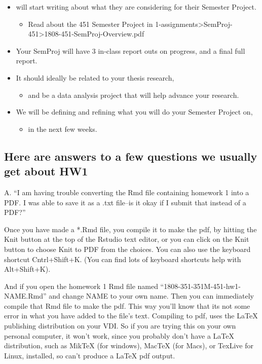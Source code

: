 \documentclass[]{article}
\providecommand{\tightlist}{%
  \setlength{\itemsep}{0pt}\setlength{\parskip}{0pt}}
\begin{document}
\begin{itemize}
\tightlist
\item
  will start writing about what they are considering for their Semester
  Project.

  \begin{itemize}
  \tightlist
  \item
    Read about the 451 Semester Project in
    1-assignments\textgreater{}SemProj-451\textgreater{}1808-451-SemProj-Overview.pdf
  \end{itemize}
\item
  Your SemProj will have 3 in-class report outs on progress, and a final
  full report.
\item
  It should ideally be related to your thesis research,

  \begin{itemize}
  \tightlist
  \item
    and be a data analysis project that will help advance your
    research.\\
  \end{itemize}
\item
  We will be defining and refining what you will do your Semester
  Project on,

  \begin{itemize}
  \tightlist
  \item
    in the next few weeks.
  \end{itemize}
\end{itemize}

\hypertarget{here-are-answers-to-a-few-questions-we-usually-get-about-hw1}{%
\subsection{Here are answers to a few questions we usually get about
HW1}\label{here-are-answers-to-a-few-questions-we-usually-get-about-hw1}}

A. ``I am having trouble converting the Rmd file containing homework 1
into a PDF. I was able to save it as a .txt file--is it okay if I submit
that instead of a PDF?''

Once you have made a *.Rmd file, you compile it to make the pdf, by
hitting the Knit button at the top of the Rstudio text editor, or you
can click on the Knit button to choose Knit to PDF from the choices. You
can also use the keyboard shortcut Cntrl+Shift+K. (You can find lots of
keyboard shortcuts help with Alt+Shift+K).

And if you open the homework 1 Rmd file named
``1808-351-351M-451-hw1-NAME.Rmd'' and change NAME to your own name.
Then you can immediately compile that Rmd file to make the pdf. This way
you'll know that its not some error in what you have added to the file's
text. Compiling to pdf, uses the LaTeX publishing distribution on your
VDI. So if you are trying this on your own personal computer, it won't
work, since you probably don't have a LaTeX distribution, such as MikTeX
(for windows), MacTeX (for Macs), or TexLive for Linux, installed, so
can't produce a LaTeX pdf output.
\end{document}
